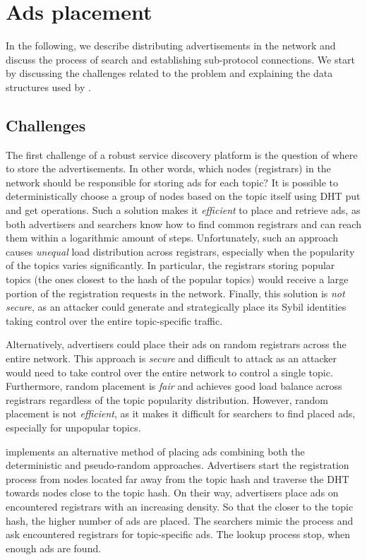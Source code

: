 
\section{Ads placement}
\label{sec:placement}
In the following, we describe distributing advertisements in the network and discuss the process of search and establishing sub-protocol connections. We start by discussing the challenges related to the problem and explaining the data structures used by \sysname. 

\subsection{Challenges}
The first challenge of a robust service discovery platform is the question of where to store the advertisements. In other words, which nodes (registrars) in the network should be responsible for storing ads for each topic? It is possible to deterministically choose a group of nodes based on the topic itself using DHT put and get operations. Such a solution makes it \emph{efficient} to place and retrieve ads, as both advertisers and searchers know how to find common registrars and can reach them within a logarithmic amount of steps. Unfortunately, such an approach causes \emph{unequal} load distribution across registrars, especially when the popularity of the topics varies significantly. In particular, the registrars storing popular topics (\ie the ones closest to the hash of the popular topics) would receive a large portion of the registration requests in the network. Finally, this solution is \emph{not secure}, as an attacker could generate and strategically place its Sybil identities taking control over the entire topic-specific traffic. 

Alternatively, advertisers could place their ads on random registrars across the entire network. This approach is \emph{secure} and difficult to attack as an attacker would need to take control over the entire network to control a single topic. Furthermore, random placement is \emph{fair} and achieves good load balance across registrars regardless of the topic popularity distribution. However, random placement is not \emph{efficient}, as it makes it difficult for searchers to find placed ads, especially for unpopular topics. 

\sysname implements an alternative method of placing ads combining both the deterministic and pseudo-random approaches. Advertisers start the registration process from nodes located far away from the topic hash and traverse the DHT towards nodes close to the topic hash. On their way, advertisers place ads on encountered registrars with an increasing density. So that the closer to the topic hash, the higher number of ads are placed. The searchers mimic the process and ask encountered registrars for topic-specific ads. The lookup process stop, when enough ads are found.

